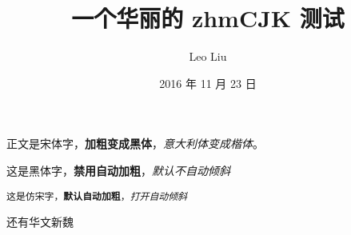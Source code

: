 \documentclass[12pt,a4paper]{article}
\title{\bfseries 一个华丽的 zhmCJK 测试}
\author{Leo Liu}
\date{2016 年 11 月 23 日}
\begin{document}
\maketitle

正文是宋体字，\textbf{加粗变成黑体}，\textit{意大利体变成楷体}。

\textsf{这是黑体字，\textbf{禁用自动加粗}，\textsl{默认不自动倾斜}}

\texttt{这是仿宋字，\textbf{默认自动加粗}，\textsl{打开自动倾斜}}

{还有华文新魏}
\end{document}
